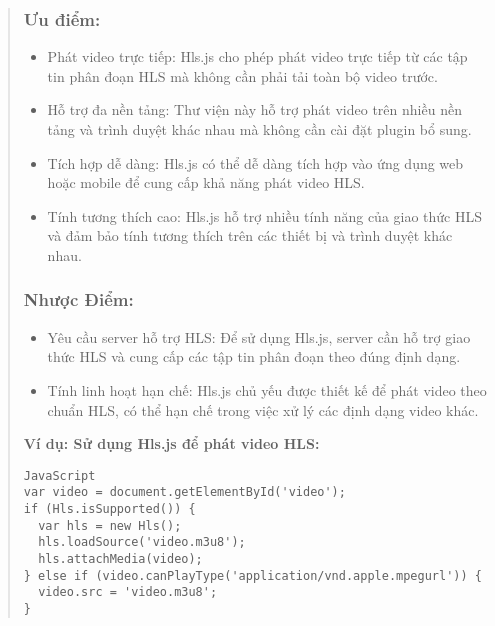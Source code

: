\begin{quote}
\subsubsection{Ưu điểm:}
\begin{itemize}
  \item Phát video trực tiếp: Hls.js cho phép phát video trực tiếp từ các tập tin phân đoạn HLS mà không cần phải tải toàn bộ video trước.
  \item Hỗ trợ đa nền tảng: Thư viện này hỗ trợ phát video trên nhiều nền tảng và trình duyệt khác nhau mà không cần cài đặt plugin bổ sung.
  \item Tích hợp dễ dàng: Hls.js có thể dễ dàng tích hợp vào ứng dụng web hoặc mobile để cung cấp khả năng phát video HLS.
  \item Tính tương thích cao: Hls.js hỗ trợ nhiều tính năng của giao thức HLS và đảm bảo tính tương thích trên các thiết bị và trình duyệt khác nhau.
\end{itemize}

\subsubsection{Nhược Điểm:}
\begin{itemize}
  \item Yêu cầu server hỗ trợ HLS: Để sử dụng Hls.js, server cần hỗ trợ giao thức HLS và cung cấp các tập tin phân đoạn theo đúng định dạng.
  \item Tính linh hoạt hạn chế: Hls.js chủ yếu được thiết kế để phát video theo chuẩn HLS, có thể hạn chế trong việc xử lý các định dạng video khác.
\end{itemize}

\textbf{Ví dụ: Sử dụng Hls.js để phát video HLS:}
\begin{lstlisting}
JavaScript
var video = document.getElementById('video');
if (Hls.isSupported()) {
  var hls = new Hls();
  hls.loadSource('video.m3u8');
  hls.attachMedia(video);
} else if (video.canPlayType('application/vnd.apple.mpegurl')) {
  video.src = 'video.m3u8';
}
\end{lstlisting}
\end{quote}




